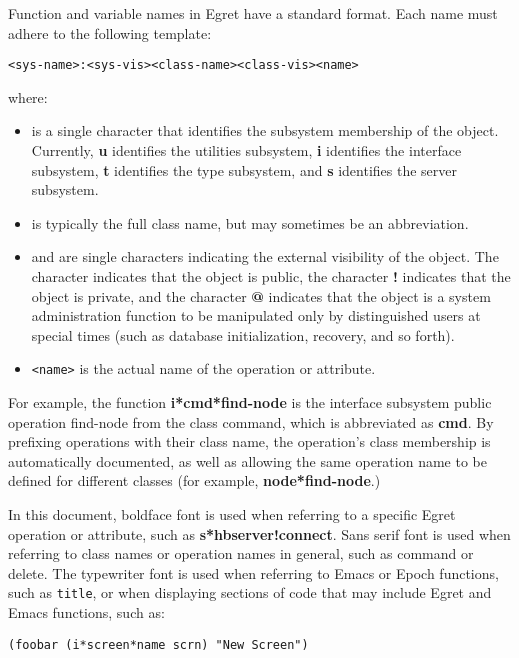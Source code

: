 Function and variable names in Egret have a standard format.
Each name must adhere to the following template:

\small\begin{verbatim}
<sys-name>:<sys-vis><class-name><class-vis><name>
\end{verbatim}\normalsize

\noindent where:
\begin{itemize}
  
\item {\tt <sys-name>} is a single character that identifies the
  subsystem membership of the object.  Currently, {\bf u} identifies the
  utilities subsystem, {\bf i} identifies the interface subsystem, {\bf t}
  identifies the type subsystem, and {\bf s} identifies the server subsystem.
  
\item {\tt <class-name>} is typically the full class name, but may
sometimes be an abbreviation.
  
\item {\tt <sys-vis>} and {\tt <class-vis>} are single characters
  indicating the external visibility of the object. The character
  {\bf *} indicates that the object is public, the character {\bf !}
  indicates that the object is private, and the character {\bf @}
  indicates that the object is a system administration function to be
  manipulated only by distinguished users at special times (such as
  database initialization, recovery, and so forth).  

  \item {\tt <name>} is the actual name of the operation or
  attribute.

\end{itemize}

For example, the function {\bf i*cmd*find-node} is the
interface subsystem public operation {\sf find-node} from the class
{\sf command}, which is abbreviated as {\bf cmd}.  By prefixing
operations with their class name, the operation's class membership is
automatically documented, as well as allowing the same operation name
to be defined for different classes (for example, {\bf node*find-node}.)

In this document, boldface font is used when referring to a specific Egret 
operation or attribute, such as {\bf s*hbserver!connect}.  Sans serif 
font is used when referring to class names or operation names in general, 
such as {\sf command} or {\sf delete}.  The typewriter font is used when
referring to Emacs or Epoch functions, such as {\tt title}, or when 
displaying sections of code that may include Egret and Emacs functions, such
as:
\small\begin{verbatim}
(foobar (i*screen*name scrn) "New Screen")
\end{verbatim}\normalsize

